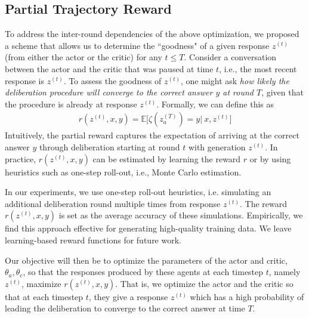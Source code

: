 \subsection{Partial Trajectory Reward}
To address the inter-round dependencies of the above optimization, we proposed a scheme that allows us to determine the ``goodness" of a given response $z^{(t)}$ (from either the actor or the critic) for any $t\leq T$. Consider a conversation between the actor and the critic that was paused at time $t$, i.e., the most recent response is $z^{(t)}$. 
To assess the goodness of $z^{(t)}$, one might ask \emph{how likely the deliberation procedure will converge to the correct answer $y$ at round $T$}, given that the procedure is already at response $z^{(t)}$. 
Formally, we can define this as
\begin{align}
    r(z^{(t)}, x, y) = \mathbb{E}\bigg[\zeta(z_a^{(T)})=y|~x, z^{(t)} \bigg]
\end{align}
Intuitively, the partial reward captures the expectation of arriving at the correct answer $y$ through deliberation starting at round $t$ with generation $z^{(t)}$. In practice, $r(z^{(t)}, x, y)$ can be estimated by learning the reward $r$ or by using heuristics such as one-step roll-out, i.e., Monte Carlo estimation. 

In our experiments, we use one-step roll-out heuristics, i.e. simulating an additional deliberation round multiple times from response \( z^{(t)} \). The reward \( r(z^{(t)}, x, y) \) is set as the average accuracy of these simulations. Empirically, we find this approach effective for generating high-quality training data. We leave learning-based reward functions for future work.

Our objective will then be to optimize the parameters of the actor and critic, $\theta_a, \theta_c$, so that the responses produced by these agents at each timestep $t$, namely $z^{(t)}$, maximize $r(z^{(t)}, x, y)$. 
That is, we optimize the actor and the critic so that at each timestep $t$, they give a response $z^{(t)}$ which has a high probability of leading the deliberation to converge to the correct answer at time $T$. 

